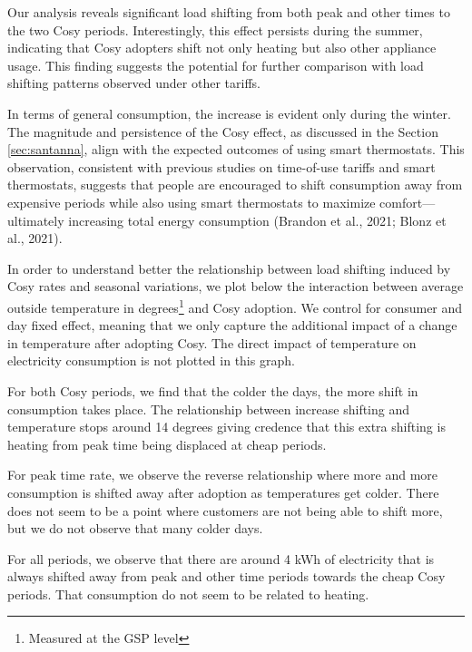 \documentclass[
]{article}
\begin{document}
Our analysis reveals significant load shifting from both peak and other times to the two Cosy periods. Interestingly, this effect persists during the summer, indicating that Cosy adopters shift not only heating but also other appliance usage. This finding suggests the potential for further comparison with load shifting patterns observed under other tariffs.

In terms of general consumption, the increase is evident only during the winter. The magnitude and persistence of the Cosy effect, as discussed in the Section \ref{sec:santanna}, align with the expected outcomes of using smart thermostats. This observation, consistent with previous studies on time-of-use tariffs and smart thermostats, suggests that people are encouraged to shift consumption away from expensive periods while also using smart thermostats to maximize comfort---ultimately increasing total energy consumption (Brandon et al., 2021; Blonz et al., 2021).

\begin{landscape}

\end{landscape}

In order to understand better the relationship between load shifting induced by Cosy rates and seasonal variations, we plot below the interaction between average outside temperature in degrees\footnote{Measured at the GSP level} and Cosy adoption. We control for consumer and day fixed effect, meaning that we only capture the additional impact of a change in temperature after adopting Cosy. The direct impact of temperature on electricity consumption is not plotted in this graph.

For both Cosy periods, we find that the colder the days, the more shift in consumption takes place. The relationship between increase shifting and temperature stops around 14 degrees giving credence that this extra shifting is heating from peak time being displaced at cheap periods.

For peak time rate, we observe the reverse relationship where more and more consumption is shifted away after adoption as temperatures get colder. There does not seem to be a point where customers are not being able to shift more, but we do not observe that many colder days.

For all periods, we observe that there are around 4 kWh of electricity that is always shifted away from peak and other time periods towards the cheap Cosy periods. That consumption do not seem to be related to heating.
\end{document}
